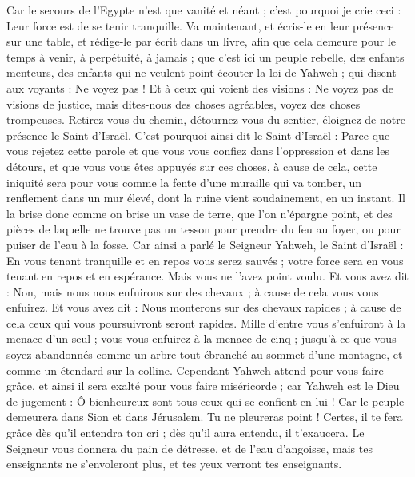 \begin{multicols}{2}
Car le secours de l'Egypte n'est que vanité et néant ; c'est pourquoi je crie ceci : Leur force est de se tenir tranquille.
Va maintenant, et écris-le en leur présence sur une table, et rédige-le par écrit dans un livre, afin que cela demeure pour le temps à venir, à perpétuité, à jamais ;
que c'est ici un peuple rebelle, des enfants menteurs, des enfants qui ne veulent point écouter la loi de Yahweh ;
qui disent aux voyants : Ne voyez pas ! Et à ceux qui voient des visions : Ne voyez pas de visions de justice, mais dites-nous des choses agréables, voyez des choses trompeuses.
Retirez-vous du chemin, détournez-vous du sentier, éloignez de notre présence le Saint d'Israël.
C'est pourquoi ainsi dit le Saint d'Israël : Parce que vous rejetez cette parole et que vous vous confiez dans l'oppression et dans les détours, et que vous vous êtes appuyés sur ces choses,
à cause de cela, cette iniquité sera pour vous comme la fente d'une muraille qui va tomber, un renflement dans un mur élevé, dont la ruine vient soudainement, en un instant.
Il la brise donc comme on brise un vase de terre, que l'on n'épargne point, et des pièces de laquelle ne trouve pas un tesson pour prendre du feu au foyer, ou pour puiser de l'eau à la fosse.
Car ainsi a parlé le Seigneur Yahweh, le Saint d'Israël : En vous tenant tranquille et en repos vous serez sauvés ; votre force sera en vous tenant en repos et en espérance. Mais vous ne l'avez point voulu.
Et vous avez dit : Non, mais nous nous enfuirons sur des chevaux ; à cause de cela vous vous enfuirez. Et vous avez dit : Nous monterons sur des chevaux rapides ; à cause de cela ceux qui vous poursuivront seront rapides.
Mille d'entre vous s'enfuiront à la menace d'un seul ; vous vous enfuirez à la menace de cinq ; jusqu'à ce que vous soyez abandonnés comme un arbre tout ébranché au sommet d'une montagne, et comme un étendard sur la colline.
Cependant Yahweh attend pour vous faire grâce, et ainsi il sera exalté pour vous faire miséricorde ; car Yahweh est le Dieu de jugement : Ô bienheureux sont tous ceux qui se confient en lui !
Car le peuple demeurera dans Sion et dans Jérusalem. Tu ne pleureras point ! Certes, il te fera grâce dès qu'il entendra ton cri ; dès qu'il aura entendu, il t'exaucera.
Le Seigneur vous donnera du pain de détresse, et de l'eau d'angoisse, mais tes enseignants ne s'envoleront plus, et tes yeux verront tes enseignants.

\end{multicols}
